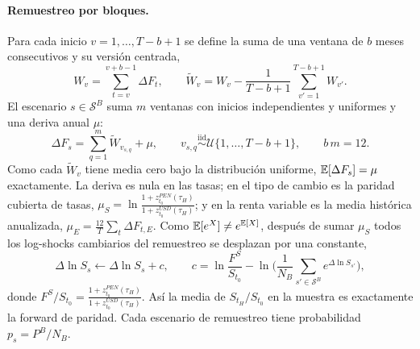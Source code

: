 \paragraph{Remuestreo por bloques.} Para cada inicio $v = 1, \dots, T-b+1$ se define la suma de una
ventana de $b$ meses consecutivos y su versión centrada,
\[
  W_v = \sum_{t=v}^{v+b-1} \Delta F_t, \qquad
  \tilde W_v = W_v - \frac{1}{T-b+1}\sum_{v'=1}^{T-b+1} W_{v'}.
\]
El escenario $s \in \mathcal{S}^B$ suma $m$ ventanas con inicios independientes y uniformes y una deriva
anual $\mu$:
\begin{equation}
  \Delta F_s = \sum_{q=1}^{m} \tilde W_{v_{s,q}} + \mu, \qquad
  v_{s,q} \overset{\text{iid}}{\sim} \mathcal{U}\{1, \dots, T-b+1\}, \qquad b\,m = 12 .
\end{equation}
Como cada $\tilde W_v$ tiene media cero bajo la distribución uniforme, $\mathbb{E}[\Delta F_s] = \mu$ exactamente.
La deriva es nula en las tasas; en el tipo de cambio es la paridad cubierta de tasas,
$\mu_S = \ln\frac{1 + z^{PEN}_{t_0}(\tau_H)}{1 + z^{USD}_{t_0}(\tau_H)}$; y en la renta variable es la
media histórica anualizada, $\mu_E = \frac{12}{T}\sum_t \Delta F_{t,E}$. Como
$\mathbb{E}[e^{X}] \neq e^{\mathbb{E}[X]}$, después de sumar $\mu_S$ todos los log-shocks cambiarios del remuestreo se
desplazan por una constante,
\begin{equation}
  \Delta \ln S_s \leftarrow \Delta \ln S_s + c, \qquad
  c = \ln\frac{F^{S}}{S_{t_0}} - \ln\Big(\frac{1}{N_B}\sum_{s' \in \mathcal{S}^B} e^{\Delta \ln S_{s'}}\Big),
\end{equation}
donde $F^{S}/S_{t_0} = \frac{1 + z^{PEN}_{t_0}(\tau_H)}{1 + z^{USD}_{t_0}(\tau_H)}$. Así la media de
$S_{t_H}/S_{t_0}$ en la muestra es exactamente la forward de paridad. Cada escenario de remuestreo tiene
probabilidad $p_s = P^B / N_B$.

